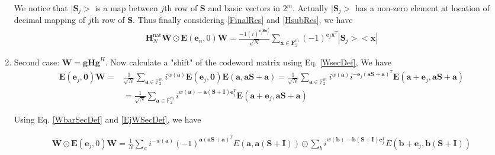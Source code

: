 \documentclass{article}
\begin{document}
\begin{enumerate}
		
		We notice that $|\mathbf{S}_j>$ is a map between $j$th row of $\mathbf{S}$ and basic vectors in $2^m$. Actually $|\mathbf{S}_j>$ has a non-zero element at location of decimal mapping of $j$th row of $\mathbf{S}$. Thus finally considering \eqref{FinalRes} and \eqref{HsubRes}, we have
		\begin{align}
			\mathbf{H}_N^{\text{nat}}\overline{\mathbf{W}} \odot \mathbf{E}(\mathbf{e}_n, 0)\mathbf{W} = \frac{-1 (i)^{\mathbf{e}_j \mathbf{S e}_j^T}}{\sqrt{N}} \sum_{ \mathbf{x} \in \mathbf{F}_2^m}{(-1)^{\mathbf{e}_j \mathbf{x}^T} |\mathbf{S}_j><\mathbf{x}| }\label{FinHcalRes}
		\end{align}
	\item Second case: $\mathbf{W=gHg}^H$. Now calculate a "shift" of the codeword matrix using Eq. \ref{WsecDef}, We have
	\begin{align}
		\mathbf{E}(\mathbf{e}_j, \mathbf{0})\mathbf{W} = &\frac{1}{\sqrt{N}} \sum_{\mathbf{a} \in \mathbb{F}^m_2} i^{w(\mathbf{a})}\mathbf{E}(\mathbf{e}_j,\mathbf{0})\mathbf{E}(\mathbf{a},\mathbf{a}\mathbf{S} + \mathbf{a}) = \frac{1}{\sqrt{N}} \sum_{\mathbf{a} \in \mathbb{F}^m_2} i^{w(\mathbf{a})}i^{-\mathbf{e}_j(\mathbf{a}\mathbf{S} + \mathbf{a})^T}\mathbf{E}(\mathbf{a} + \mathbf{e}_j,\mathbf{a}\mathbf{S} + \mathbf{a}) \nonumber \\ 
		 &= \frac{1}{\sqrt{N}} \sum_{\mathbf{a} \in \mathbb{F}^m_2} i^{w(\mathbf{a})-\mathbf{a}(\mathbf{S} + \mathbf{I})\mathbf{e}_j^T}\mathbf{E}(\mathbf{a} + \mathbf{e}_j,\mathbf{a}\mathbf{S} + \mathbf{a}) \label{EjWSecDef}
	\end{align}
	
	
Using Eq. \ref{WbarSecDef} and \ref{EjWSecDef}, we have
	
	\begin{align*}
		\overline{\mathbf{W}} \odot \mathbf{E}(\mathbf{e}_j, 0)\mathbf{W} = \frac{1}{N} \sum_a i^{-w(\mathbf{a})}(-1)^{\mathbf{a}(\mathbf{a}\mathbf{S} + \mathbf{a})^T} E(\mathbf{a}, \mathbf{a}(\mathbf{S} + \mathbf{I})) \odot \sum_b i^{w(\mathbf{b}) - \mathbf{b}(\mathbf{S} + \mathbf{I})\mathbf{e}_j^T} E(\mathbf{b} + \mathbf{e}_j, \mathbf{b}(\mathbf{S} + \mathbf{I}))
	\end{align*}


\end{enumerate}
\end{document}
